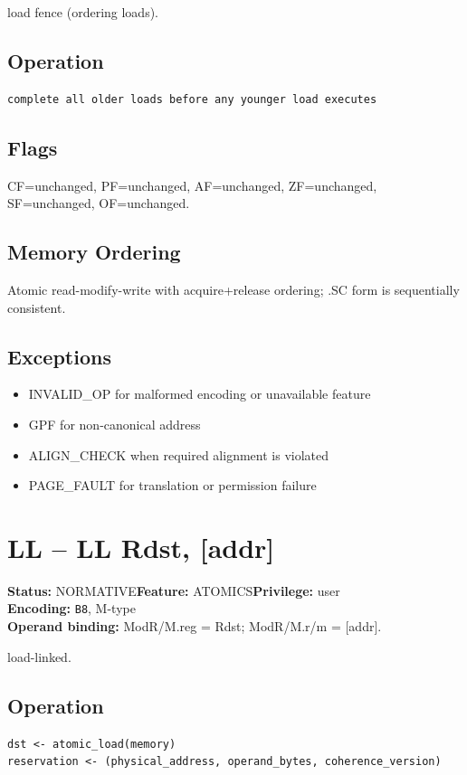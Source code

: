 \documentclass[10pt]{article}
\begin{document}
load fence (ordering loads).

\subsection*{Operation}
\begin{lstlisting}
complete all older loads before any younger load executes
\end{lstlisting}
\subsection*{Flags}
CF=unchanged, PF=unchanged, AF=unchanged, ZF=unchanged, SF=unchanged, OF=unchanged.
\subsection*{Memory Ordering}
Atomic read-modify-write with acquire+release ordering; .SC form is sequentially consistent.
\subsection*{Exceptions}
\begin{itemize}
\item INVALID\_OP for malformed encoding or unavailable feature
\item GPF for non-canonical address
\item ALIGN\_CHECK when required alignment is violated
\item PAGE\_FAULT for translation or permission failure
\end{itemize}
\clearpage

\section{LL -- LL Rdst, [addr]}
\textbf{Status:} NORMATIVE\quad \textbf{Feature:} ATOMICS\quad \textbf{Privilege:} user\\
\textbf{Encoding:} \texttt{B8}, M-type\\
\textbf{Operand binding:} ModR/M.reg = Rdst; ModR/M.r/m = [addr].

load-linked.

\subsection*{Operation}
\begin{lstlisting}
dst <- atomic_load(memory)
reservation <- (physical_address, operand_bytes, coherence_version)
\end{lstlisting}
\end{document}
